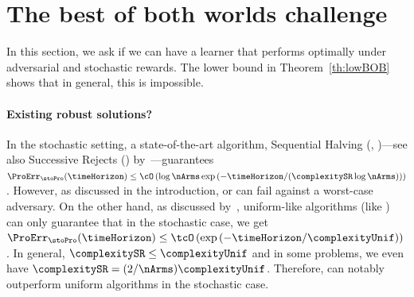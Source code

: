 %
\section{The best of both worlds challenge}
\label{s:FormuBOB}
%
In this section, we ask if we can have a learner 
that performs optimally under adversarial and stochastic rewards. 
The lower bound in Theorem~\ref{th:lowBOB} shows that in general,
this is impossible.\vspace{.2cm}


%
\paragraph{Existing robust solutions?} In the stochastic setting,
a state-of-the-art algorithm, Sequential Halving (\SH{}, 
\citealp{Karnin13AO})---see also Successive Rejects (\SR{}) 
by~\cite{Audibert10BA}---guarantees 
$\ProErr_{\stoPro}(\timeHorizon) \leq \cO\left(\log\nArms\exp
\left(-\timeHorizon/(\complexitySR\log\nArms)\right)\right)$. 
However, as discussed in the introduction, \SR{} or \SH{} can fail  
against a worst-case adversary.
On the other hand, as discussed by~\cite{Audibert10BA},  
uniform-like algorithms (like \RULE{}) can only guarantee that
in the stochastic case, we get $\ProErr_{\stoPro}(\timeHorizon) \leq  
\tcO\left(\exp\left(-\timeHorizon/\complexityUnif\right)\right)$.
In general, $\complexitySR\leq\complexityUnif$ and 
in some problems, we even have $\complexitySR=(2/\nArms)\complexityUnif$. 
Therefore, \SH{} can notably outperform uniform 
algorithms in the stochastic case.%


%
